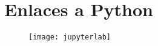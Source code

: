 \section{Enlaces a Python}

\begin{figure}[ht!]
	\centering
	\texttt{[image: jupyterlab]}
	\label{fig:gitpod02}
\end{figure}
